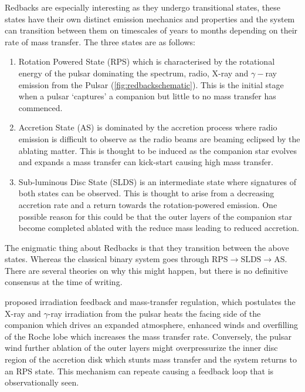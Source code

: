 Redbacks are especially interesting as they undergo transitional states, these states have their own distinct emission mechanics and properties and the system can transition between them on timescales of years to months depending on their rate of mass transfer. The three states are as follows: 

\begin{enumerate}
    \item Rotation Powered State (RPS) which is characterised by the rotational energy of the pulsar dominating the spectrum, radio, X-ray and $\gamma-$ray emission from the Pulsar (\cref{fig:redbackschematic}). This is the initial stage when a pulsar `captures' a companion but little to no mass transfer has commenced. 
    
    \item Accretion State (AS) is dominated by the accretion process where radio emission is difficult to observe as the radio beams are beaming eclipsed by the ablating matter. This is thought to be induced as the companion star evolves and expands a mass transfer can kick-start causing high mass transfer.  
    
    \item Sub-luminous Disc State (SLDS) is an intermediate state where signatures of both states can be observed. This is thought to arise from a decreasing accretion rate and a return towards the rotation-powered emission. One possible reason for this could be that the outer layers of the companion star become completed ablated with the reduce mass leading to reduced accretion. 
\end{enumerate}

The enigmatic thing about Redbacks is that they transition between the above states. Whereas the classical binary system goes through $\text{RPS} \longrightarrow \text{SLDS} \longrightarrow \text{AS}$. There are several theories on why this might happen, but there is no definitive consensus at the time of writing. 

\cite{benvenuto_understanding_2014} proposed irradiation feedback and mass-transfer regulation, which postulates the X-ray and $\gamma$-ray irradiation from the pulsar heats the facing side of the companion which drives an expanded atmosphere, enhanced winds and overfilling of the Roche lobe which increases the mass transfer rate. Conversely, the pulsar wind further ablation of the outer layers might overpressurize the inner disc region of the accretion disk which stunts mass transfer and the system returns to an RPS state. This mechanism can repeate causing a feedback loop that is observationally seen. 

